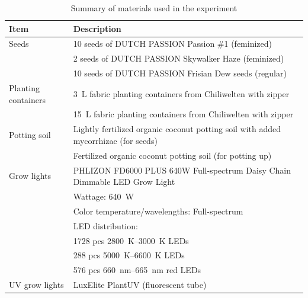 \begin{table}[htbp]
    \centering
    \caption{Summary of materials used in the experiment}
    \label{tab:materials}
    \begin{tabularx}{\linewidth}{l|X}
        \toprule
        \textbf{Item} & \textbf{Description} \\
        \midrule
        Seeds\index{seeds!cannabis} & 10 seeds of DUTCH PASSION Passion \#1\index{seeds!cannabis!Passion \#1} (feminized) \\
        & 2 seeds of DUTCH PASSION Skywalker Haze\index{seeds!cannabis!Skywalker Haze} (feminized) \\
        & 10 seeds of DUTCH PASSION Frisian Dew seeds\index{seeds!cannabis!Frisian Dew} (regular) \\
        \bigstrut
        Planting containers\index{planting container} & \qty[mode=text]{3}{\L} fabric planting containers from Chiliwelten with zipper \\
        & \qty[mode=text]{15}{\L} fabric planting containers from Chiliwelten with zipper \\
        \bigstrut
        Potting soil\index{potting soil} & Lightly fertilized organic coconut potting soil with added mycorrhizae\index{mycorrhizae} (for seeds) \\
        & Fertilized organic coconut potting soil (for potting up) \\
        \bigstrut
        Grow lights\index{grow light!LED} & PHLIZON FD6000 PLUS 640W Full-spectrum Daisy Chain Dimmable LED Grow Light\index{grow light!LED!PHLIZON FD6000 PLUS 640W Full-spectrum} \\
        & \quad Wattage: \qty[mode=text]{640}{\W} \\
        & \quad Color temperature/wavelengths: Full-spectrum \\
        & \quad LED distribution: \\
        & \quad \quad \num[mode=text]{1728} pcs \qtyrange[mode=text, range-phrase=\textendash, range-units=single]{2800}{3000}{\K} LEDs \\
        & \quad \quad \num[mode=text]{288} pcs \qtyrange[mode=text, range-phrase=\textendash, range-units=single]{5000}{6600}{\K} LEDs \\
        & \quad \quad \num[mode=text]{576} pcs \qtyrange[mode=text, range-phrase=\textendash, range-units=single]{660}{665}{\nm} red LEDs \\
        \bigstrut
        UV grow lights\index{grow light!UV} & LuxElite PlantUV (fluorescent tube)\index{grow light!UV!LuxElite PlantUV} \\

\end{tabularx}
\end{table}
